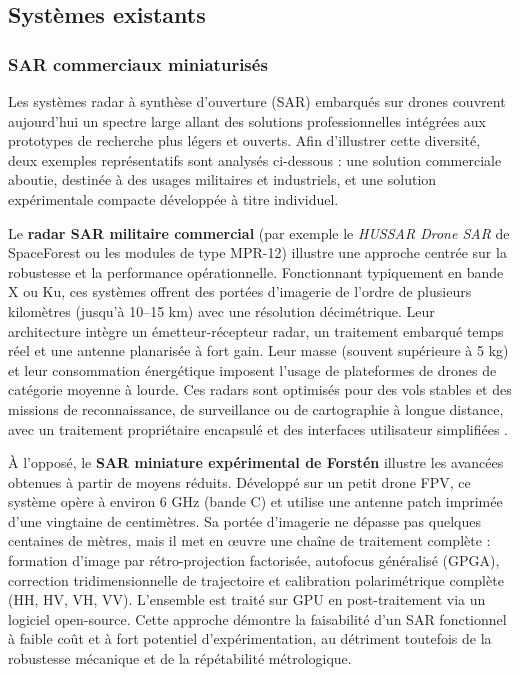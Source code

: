 \subsection{Systèmes existants}
\subsubsection{SAR commerciaux miniaturisés}

Les systèmes radar à synthèse d’ouverture (SAR) embarqués sur drones couvrent aujourd’hui un spectre large allant des solutions professionnelles intégrées aux prototypes de recherche plus légers et ouverts.  
Afin d’illustrer cette diversité, deux exemples représentatifs sont analysés ci-dessous :  
une solution commerciale aboutie, destinée à des usages militaires et industriels, et une solution expérimentale compacte développée à titre individuel.

Le \textbf{radar SAR militaire commercial} (par exemple le \emph{HUSSAR Drone SAR} de SpaceForest ou les modules de type MPR-12) illustre une approche centrée sur la robustesse et la performance opérationnelle.  
Fonctionnant typiquement en bande X ou Ku, ces systèmes offrent des portées d’imagerie de l’ordre de plusieurs kilomètres (jusqu’à 10–15 km) avec une résolution décimétrique.  
Leur architecture intègre un émetteur-récepteur radar, un traitement embarqué temps réel et une antenne planarisée à fort gain.  
Leur masse (souvent supérieure à 5 kg) et leur consommation énergétique imposent l’usage de plateformes de drones de catégorie moyenne à lourde.  
Ces radars sont optimisés pour des vols stables et des missions de reconnaissance, de surveillance ou de cartographie à longue distance, avec un traitement propriétaire encapsulé et des interfaces utilisateur simplifiées \cite{HUSSAR2025}.

À l’opposé, le \textbf{SAR miniature expérimental de Forstén} \cite{Forsten2025} illustre les avancées obtenues à partir de moyens réduits.  
Développé sur un petit drone FPV, ce système opère à environ 6 GHz (bande C) et utilise une antenne patch imprimée d’une vingtaine de centimètres.  
Sa portée d’imagerie ne dépasse pas quelques centaines de mètres, mais il met en œuvre une chaîne de traitement complète : formation d’image par rétro-projection factorisée, autofocus généralisé (GPGA), correction tridimensionnelle de trajectoire et calibration polarimétrique complète (HH, HV, VH, VV).  
L’ensemble est traité sur GPU en post-traitement via un logiciel open-source.  
Cette approche démontre la faisabilité d’un SAR fonctionnel à faible coût et à fort potentiel d’expérimentation, au détriment toutefois de la robustesse mécanique et de la répétabilité métrologique.

